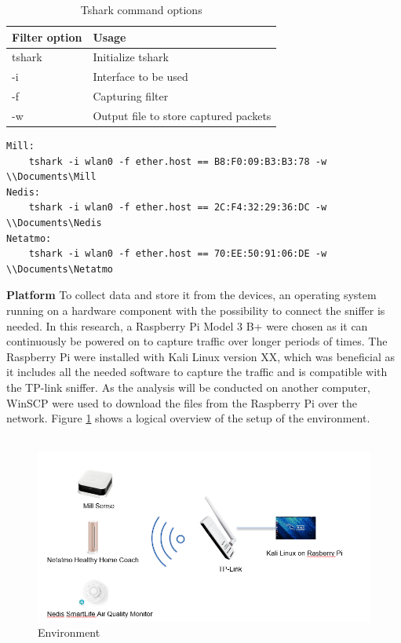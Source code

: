 \begin{table}[H]
    \centering
    \caption{Tshark command options}
    \begin{tabular}{|l|l|}
    \hline
    \textbf{Filter option} & \textbf{Usage}                        \\ \hline
    tshark                 & Initialize tshark                     \\ \hline
    -i                     & Interface to be used                  \\ \hline
    -f                     & Capturing filter                      \\ \hline
    -w                     & Output file to store captured packets \\ \hline
    \end{tabular}
    \label{tab:tshark}
\end{table}

\begin{verbatim}
Mill:
    tshark -i wlan0 -f ether.host == B8:F0:09:B3:B3:78 -w \\Documents\Mill
Nedis:
    tshark -i wlan0 -f ether.host == 2C:F4:32:29:36:DC -w \\Documents\Nedis
Netatmo:
    tshark -i wlan0 -f ether.host == 70:EE:50:91:06:DE -w \\Documents\Netatmo
\end{verbatim}

\textbf{Platform}
To collect data and store it from the devices, an operating system running on a hardware component with the possibility to connect the sniffer is needed. In this research, a Raspberry Pi Model 3 B+ were chosen as it can continuously be powered on to capture traffic over longer periods of times. The Raspberry Pi were installed with Kali Linux version XX, which was beneficial as it includes all the needed software to capture the traffic and is compatible with the TP-link sniffer. As the analysis will be conducted on another computer, WinSCP were used to download the files from the Raspberry Pi over the network. Figure \ref{fig:Environment} shows a logical overview of the setup of the environment.  
\\\\
\begin{figure} [!ht]
    \centering
    \includegraphics[width=1\textwidth]{figures/Environment.png}
    \caption{Environment}
    \label{fig:Environment}
\end{figure}

